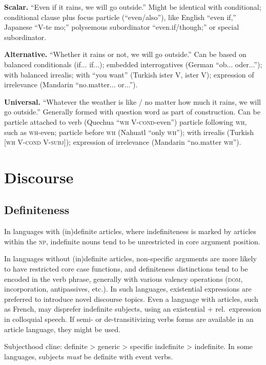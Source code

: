 \documentclass[11pt]{article}
\newcommand{\I}[1]{\textsc{#1}}   %
\begin{document}
{\textbf{Scalar.} ``Even if it rains, we will go outside.''  Might be
identical with conditional; conditional clause plus focus particle
(``even/also''), like English ``even if,'' Japanese ``V-te mo;''
polysemous subordinator ``even.if/though;'' or special subordinator.

\textbf{Alternative.} ``Whether it rains or not, we will go outside.''
Can be based on balanced conditionals (if... if...); embedded
interrogatives (German ``ob... oder...''); with balanced irrealis;
with ``you want'' (Turkish ister V, ister V); expression of
irrelevance (Mandarin ``no.matter... or...'').

\textbf{Universal.} ``Whatever the weather is like / no matter how much
it rains, we will go outside.''  Generally formed with question word
as part of construction.  Can be particle attached to verb (Quechua
``\I{wh} V-\I{cond}-even'') particle following \I{wh}, such as
\I{wh}-even; particle before \I{wh} (Nahuatl ``only \I{wh}''); with
irrealis (Turkish [\I{wh V-cond V-subj}]); expression of irrelevance
(Mandarin ``no.matter \I{wh}'').


\section{Discourse}

\subsection{Definiteness}
In languages with (in)definite articles, where indefiniteness is
marked by articles within the \I{np}, indefinite nouns tend to be
unrestricted in core argument position.

In languages without (in)definite articles, non-specific arguments are
more likely to have restricted core case functions, and definiteness
distinctions tend to be encoded in the verb phrase, generally with
various valency operations (\I{dom}, incorporation, antipassives,
etc.).  In such languages, existential expressions are preferred to
introduce novel discourse topics.  Even a language with articles, such
as French, may disprefer indefinite subjects, using an existential +
rel.\ expression in colloquial speech.  If semi- or de-transitivizing
verbs forms are available in an article language, they might be used.

Subjecthood cline: definite > generic > specific indefinite >
indefinite.  In some languages, subjects \textit{must} be definite
with event verbs.

}
\end{document}
